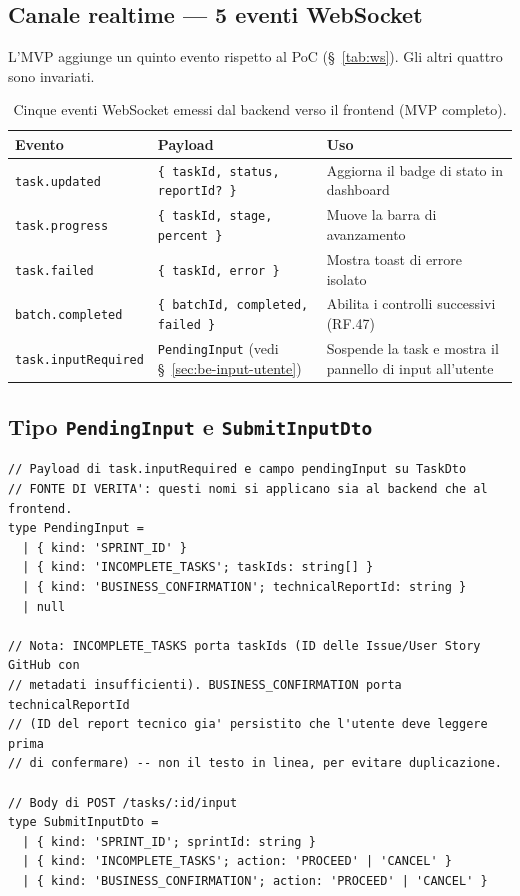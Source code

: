 \documentclass[11pt,a4paper]{article}
\begin{document}
\subsection{Canale realtime --- 5 eventi WebSocket}
\label{sec:be-ws}

L'MVP aggiunge un quinto evento rispetto al PoC (\S~\ref{tab:ws}). Gli altri quattro sono invariati.

\begin{table}[H]
\centering
\caption{Cinque eventi WebSocket emessi dal backend verso il frontend (MVP completo).}
\label{tab:be-ws}
\vspace{2mm}
\renewcommand{\arraystretch}{1.2}
\begin{tabularx}{\textwidth}{|l|X|X|}
\hline
\textbf{Evento} & \textbf{Payload} & \textbf{Uso} \\ \hline
\texttt{task.updated} & \texttt{\{ taskId, status, reportId? \}} & Aggiorna il badge di stato in dashboard \\ \hline
\texttt{task.progress} & \texttt{\{ taskId, stage, percent \}} & Muove la barra di avanzamento \\ \hline
\texttt{task.failed} & \texttt{\{ taskId, error \}} & Mostra toast di errore isolato \\ \hline
\texttt{batch.completed} & \texttt{\{ batchId, completed, failed \}} & Abilita i controlli successivi (RF.47) \\ \hline
\texttt{task.inputRequired} & \texttt{PendingInput} (vedi \S~\ref{sec:be-input-utente}) & Sospende la task e mostra il pannello di input all'utente \\ \hline
\end{tabularx}
\end{table}

\subsection{Tipo \texttt{PendingInput} e \texttt{SubmitInputDto}}

\begin{lstlisting}[caption={Tipo \texttt{PendingInput} (payload di \texttt{task.inputRequired}) e \texttt{SubmitInputDto} (body di \texttt{POST /tasks/:id/input}). I kind name qui definiti sono la fonte di verita': il frontend aderisce a questa nomenclatura.}]
// Payload di task.inputRequired e campo pendingInput su TaskDto
// FONTE DI VERITA': questi nomi si applicano sia al backend che al frontend.
type PendingInput =
  | { kind: 'SPRINT_ID' }
  | { kind: 'INCOMPLETE_TASKS'; taskIds: string[] }
  | { kind: 'BUSINESS_CONFIRMATION'; technicalReportId: string }
  | null

// Nota: INCOMPLETE_TASKS porta taskIds (ID delle Issue/User Story GitHub con
// metadati insufficienti). BUSINESS_CONFIRMATION porta technicalReportId
// (ID del report tecnico gia' persistito che l'utente deve leggere prima
// di confermare) -- non il testo in linea, per evitare duplicazione.

// Body di POST /tasks/:id/input
type SubmitInputDto =
  | { kind: 'SPRINT_ID'; sprintId: string }
  | { kind: 'INCOMPLETE_TASKS'; action: 'PROCEED' | 'CANCEL' }
  | { kind: 'BUSINESS_CONFIRMATION'; action: 'PROCEED' | 'CANCEL' }
\end{lstlisting}
\end{document}
